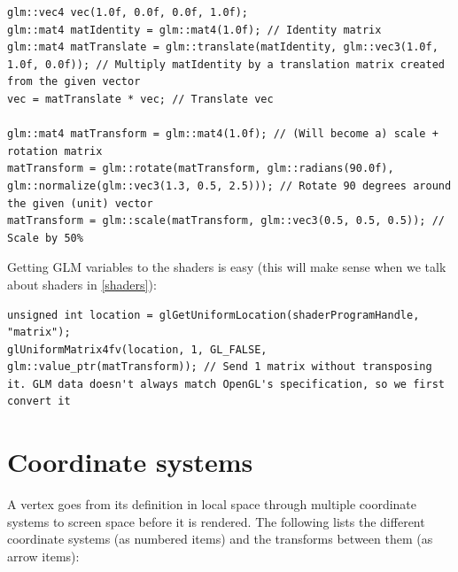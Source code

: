 \documentclass[table, xcdraw]{article}%
\begin{document}
\begin{verbatim}
glm::vec4 vec(1.0f, 0.0f, 0.0f, 1.0f);
glm::mat4 matIdentity = glm::mat4(1.0f); // Identity matrix
glm::mat4 matTranslate = glm::translate(matIdentity, glm::vec3(1.0f, 1.0f, 0.0f)); // Multiply matIdentity by a translation matrix created from the given vector
vec = matTranslate * vec; // Translate vec

glm::mat4 matTransform = glm::mat4(1.0f); // (Will become a) scale + rotation matrix
matTransform = glm::rotate(matTransform, glm::radians(90.0f), glm::normalize(glm::vec3(1.3, 0.5, 2.5))); // Rotate 90 degrees around the given (unit) vector
matTransform = glm::scale(matTransform, glm::vec3(0.5, 0.5, 0.5)); // Scale by 50%
\end{verbatim}

Getting GLM variables to the shaders is easy (this will make sense when we talk about shaders in \ref{shaders}):

\begin{verbatim}
unsigned int location = glGetUniformLocation(shaderProgramHandle, "matrix");
glUniformMatrix4fv(location, 1, GL_FALSE, glm::value_ptr(matTransform)); // Send 1 matrix without transposing it. GLM data doesn't always match OpenGL's specification, so we first convert it
\end{verbatim}

\section{Coordinate systems}

A vertex goes from its definition in local space through multiple coordinate systems to screen space before it is rendered. The following lists the different coordinate systems (as numbered items) and the transforms between them (as arrow items):
\end{document}
